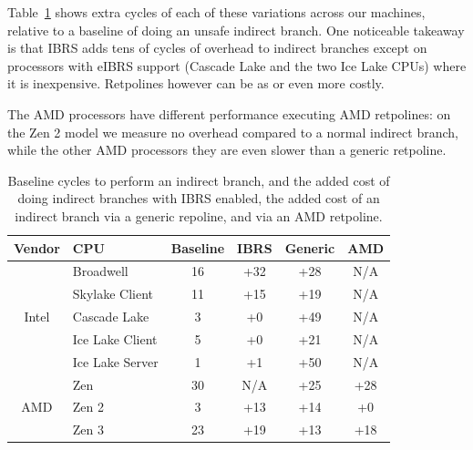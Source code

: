 Table~\ref{table:retpoline} shows extra cycles of each of these variations across our machines, relative to a baseline of doing an unsafe indirect branch.
One noticeable takeaway is that IBRS adds tens of cycles of overhead to indirect branches except on processors with eIBRS support (Cascade Lake and the two Ice Lake CPUs) where it is inexpensive.
Retpolines however can be as or even more costly.

The AMD processors have different performance executing AMD
retpolines: on the Zen 2 model we measure no overhead compared to a
normal indirect branch, while the other AMD processors they are even
slower than a generic retpoline.





\begin{table}[h]
\begin{center}
\begin{tabular}{ clcccc }
  \textbf{Vendor} & \textbf{CPU} & \textbf{Baseline} & \textbf{IBRS} & \textbf{Generic} & \textbf{AMD} \\ \hline
  \multirow{5}{*}{Intel} & Broadwell           & 16 & +32 & +28 & \tiny{N/A} \\
                         & Skylake Client      & 11 & +15 & +19 & \tiny{N/A} \\
                         & Cascade Lake        & 3 & +0 & +49 & \tiny{N/A} \\
                         & Ice Lake Client     & 5 & +0 & +21 & \tiny{N/A} \\
                         & Ice Lake Server     & 1 & +1 & +50 & \tiny{N/A} \\ \hline
  \multirow{3}{*}{AMD}   & Zen                 & 30 & \tiny{N/A} & +25 & +28 \\
                         & Zen 2               & 3 & +13 & +14 & +0 \\
                         & Zen 3               & 23 & +19 & +13 & +18 \\ \hline
\end{tabular}
\end{center}
\caption{Baseline cycles to perform an indirect branch, and the added cost of doing indirect branches with IBRS enabled, the added cost of an indirect branch via a generic repoline, and via an AMD retpoline.}
\label{table:retpoline}
\end{table}

